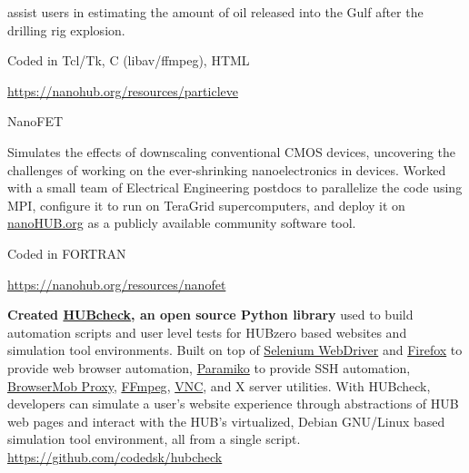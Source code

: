 \documentclass[10pt]{article}
\newcommand{\blankline}{\quad\pagebreak[3]}
\begin{document}
\begin{outerlist}
\begin{innerlist}
\begin{outerlist}
\begin{innerlist}
                              assist users in estimating the amount of oil
                              released into the Gulf after the drilling rig explosion.
                            \item[] Coded in Tcl/Tk, C (libav/ffmpeg), HTML
                            \item[] \url{https://nanohub.org/resources/particleve} \hfill{}
                        \end{innerlist}
                    \item[] NanoFET
                        \begin{innerlist}
                            \item[] Simulates the effects
                              of downscaling conventional CMOS devices,
                              uncovering the challenges of working on the
                              ever-shrinking nanoelectronics in devices.
                              Worked with a small team of Electrical Engineering
                              postdocs to parallelize the code using MPI,
                              configure it to run on TeraGrid supercomputers,
                              and deploy it on \href{https://nanohub.org}{nanoHUB.org}
                              as a publicly available community software
                              tool.
                            \item[] Coded in FORTRAN
                            \item[] \url{https://nanohub.org/resources/nanofet} \hfill{}
                        \end{innerlist}
                \end{outerlist}

            \blankline

            \item \textbf{Created \href{https://github.com/codedsk/hubcheck}{HUBcheck},
                an open source Python library} used to build automation scripts
                and user level tests for HUBzero based websites and simulation tool
                environments.  Built on top of
                \href{http://www.seleniumhq.org/projects/webdriver}{Selenium WebDriver}
                and \href{https://www.mozilla.org/en-US/firefox/new}{Firefox}
                to provide web browser automation,
                \href{http://www.paramiko.org}{Paramiko} to provide SSH automation,
                \href{https://bmp.lightbody.net}{BrowserMob Proxy},
                \href{https://www.ffmpeg.org}{FFmpeg},
                \href{http://www.karlrunge.com/x11vnc/}{VNC},
                and X server utilities. With HUBcheck, developers can
                simulate a user's website experience through abstractions of HUB
                web pages and interact with the HUB's virtualized, Debian GNU/Linux
                based simulation tool environment, all from a single script.\\
                \url{https://github.com/codedsk/hubcheck}


\end{innerlist}
\end{outerlist}
\end{document}
